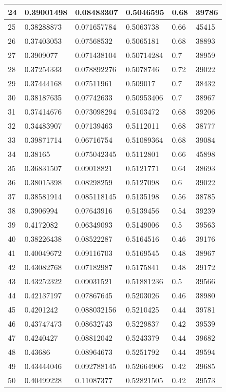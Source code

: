 \begin{longtable}{|l|l|l|l|l|l|}
24 & 0.39001498 & 0.08483307 & 0.5046595 & 0.68 & 39786 \\ \hline 
25 & 0.38288873 & 0.071657784 & 0.5063738 & 0.66 & 45415 \\ \hline 
26 & 0.37403053 & 0.07568532 & 0.5065181 & 0.68 & 38893 \\ \hline 
27 & 0.3909077 & 0.071438104 & 0.50714284 & 0.7 & 38959 \\ \hline 
28 & 0.37254333 & 0.078892276 & 0.5078746 & 0.72 & 39022 \\ \hline 
29 & 0.37444168 & 0.07511961 & 0.509017 & 0.7 & 38432 \\ \hline 
30 & 0.38187635 & 0.07742633 & 0.50953406 & 0.7 & 38967 \\ \hline 
31 & 0.37414676 & 0.073098294 & 0.5103472 & 0.68 & 39206 \\ \hline 
32 & 0.34483907 & 0.07139463 & 0.5112011 & 0.68 & 38777 \\ \hline 
33 & 0.39871714 & 0.06716754 & 0.51089364 & 0.68 & 39084 \\ \hline 
34 & 0.38165 & 0.075042345 & 0.5112801 & 0.66 & 45898 \\ \hline 
35 & 0.36831507 & 0.09018821 & 0.5121771 & 0.64 & 38693 \\ \hline 
36 & 0.38015398 & 0.08298259 & 0.5127098 & 0.6 & 39022 \\ \hline 
37 & 0.38581914 & 0.085118145 & 0.5135198 & 0.56 & 38785 \\ \hline 
38 & 0.3906994 & 0.07643916 & 0.5139456 & 0.54 & 39239 \\ \hline 
39 & 0.4172082 & 0.06349093 & 0.5149006 & 0.5 & 39563 \\ \hline 
40 & 0.38226438 & 0.08522287 & 0.5164516 & 0.46 & 39176 \\ \hline 
41 & 0.40049672 & 0.09116703 & 0.5169545 & 0.48 & 38967 \\ \hline 
42 & 0.43082768 & 0.07182987 & 0.5175841 & 0.48 & 39172 \\ \hline 
43 & 0.43252322 & 0.09031521 & 0.51881236 & 0.5 & 39566 \\ \hline 
44 & 0.42137197 & 0.07867645 & 0.5203026 & 0.46 & 38980 \\ \hline 
45 & 0.4201242 & 0.088032156 & 0.5210425 & 0.44 & 39781 \\ \hline 
46 & 0.43747473 & 0.08632743 & 0.5229837 & 0.42 & 39539 \\ \hline 
47 & 0.4240427 & 0.08812042 & 0.5243379 & 0.44 & 39682 \\ \hline 
48 & 0.43686 & 0.08964673 & 0.5251792 & 0.44 & 39594 \\ \hline 
49 & 0.43444046 & 0.092788145 & 0.52664906 & 0.42 & 39685 \\ \hline 
50 & 0.40499228 & 0.11087377 & 0.52821505 & 0.42 & 39573 \\ \hline 
\end{longtable}